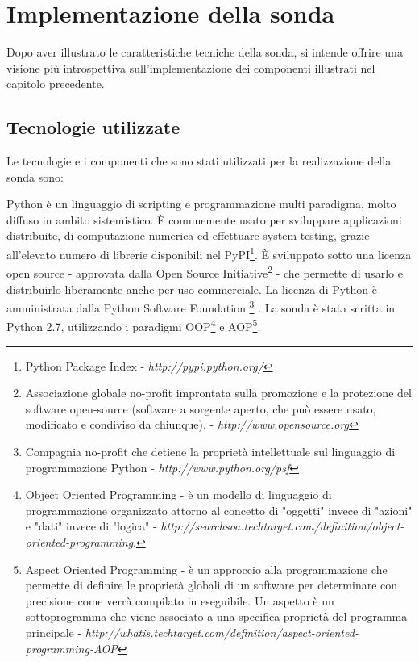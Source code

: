 \documentclass[../main.tex]{subfiles}
\begin{document}
\chapter{Implementazione della sonda}
Dopo aver illustrato le caratteristiche tecniche della sonda, si intende offrire una visione più introspettiva sull'implementazione dei componenti illustrati nel capitolo precedente.

\section{Tecnologie utilizzate}
Le tecnologie e i componenti che sono stati utilizzati per la realizzazione della sonda sono:
\newline
\begin{description}[nolistsep]
\item[Python 2.7]
Python è un linguaggio di scripting e programmazione multi paradigma, molto diffuso in ambito sistemistico.
\`E comunemente usato per sviluppare applicazioni distribuite, di computazione numerica ed effettuare system testing, grazie all'elevato numero di librerie disponibili nel PyPI\footnote{Python Package Index - \textit{http://pypi.python.org/}}.
\`E sviluppato sotto una licenza open source - approvata dalla Open Source Initiative\footnote{Associazione globale no-profit improntata sulla promozione e la protezione del software open-source (software a sorgente aperto, che può essere usato, modificato e condiviso da chiunque). - \textit{http://www.opensource.org}} - che permette di usarlo e distribuirlo liberamente anche per uso commerciale.
\newline La licenza di Python è amministrata dalla Python Software Foundation
\footnote{Compagnia no-profit che detiene la proprietà intellettuale sul linguaggio di programmazione Python - \textit{http://www.python.org/psf}}
\cite{PythonWebsite}.
\newline
La sonda è stata scritta in Python 2.7, utilizzando i paradigmi OOP\footnote{Object Oriented Programming - è un modello di linguaggio di programmazione organizzato attorno al concetto di "oggetti" invece di "azioni" e "dati" invece di "logica" - \textit{http://searchsoa.techtarget.com/definition/object-oriented-programming}.} e AOP\footnote{Aspect Oriented Programming - è un approccio alla programmazione che permette di definire le proprietà globali di un software per determinare con precisione come verrà compilato in eseguibile. Un aspetto è un sottoprogramma che viene associato a una specifica proprietà del programma principale - \textit{http://whatis.techtarget.com/definition/aspect-oriented-programming-AOP} }.
\newline


\end{description}
\end{document}
